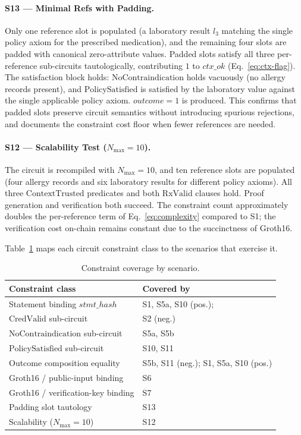 \documentclass[journal]{IEEEtran}
\begin{document}
\paragraph{S13 --- Minimal Refs with Padding.}
Only one reference slot is populated (a laboratory result $l_3$ 
matching the single policy axiom for the prescribed medication), 
and the remaining four slots are padded with
canonical zero-attribute values. Padded slots satisfy all three
per-reference sub-circuits tautologically, contributing $1$ to
$\mathit{ctx\_ok}$ (Eq.~\ref{eq:ctx-flag}). The satisfaction block
holds: $\mathrm{NoContraindication}$ holds vacuously (no
allergy records present), and $\mathrm{PolicySatisfied}$ is 
satisfied by the laboratory value against the single applicable 
policy axiom. $\mathit{outcome} = 1$ is produced. This
confirms that padded slots preserve circuit semantics without
introducing spurious rejections, and documents the constraint cost
floor when fewer references are needed.

\paragraph{S12 --- Scalability Test ($N_{\max} = 10$).}
The circuit is recompiled with $N_{\max} = 10$, and ten reference
slots are populated (four allergy records and six laboratory 
results for different policy axioms). All three
$\mathrm{ContextTrusted}$ predicates and both
$\mathrm{RxValid}$ clauses hold. Proof generation and verification
both succeed. The constraint count approximately doubles the
per-reference term of Eq.~\ref{eq:complexity} compared to S1; the
verification cost on-chain remains constant due to the succinctness
of Groth16.

\medskip
\noindent
Table~\ref{tab:coverage} maps each circuit constraint class to the
scenarios that exercise it.

\begin{table}[h]
\centering
\caption{Constraint coverage by scenario.}
\label{tab:coverage}
\footnotesize
\renewcommand{\arraystretch}{1.1}
\begin{tabular}{l p{3.8cm}}
\toprule
\textbf{Constraint class} & \textbf{Covered by} \\
\midrule
Statement binding $\mathit{stmt\_hash}$    & S1, S5a, S10 (pos.); \\
$\mathrm{CredValid}$ sub-circuit            & S2 (neg.) \\
$\mathrm{NoContraindication}$ sub-circuit   & S5a, S5b \\
$\mathrm{PolicySatisfied}$ sub-circuit      & S10, S11 \\
Outcome composition equality                & S5b, S11 (neg.); S1, S5a, S10 (pos.) \\
Groth16 / public-input binding              & S6 \\
Groth16 / verification-key binding          & S7 \\
Padding slot tautology                      & S13 \\
Scalability ($N_{\max} = 10$)               & S12 \\
\bottomrule
\end{tabular}
\end{table}
\end{document}
